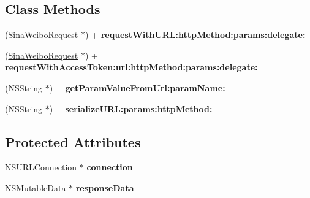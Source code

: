 \subsection*{Class Methods}
\begin{DoxyCompactItemize}
\item 
\mbox{\label{interfaceSinaWeiboRequest_a4ea79b9488ce4e5341ebba2f65e2be1d}} 
(\hyperlink{interfaceSinaWeiboRequest}{Sina\+Weibo\+Request} $\ast$) + {\bfseries request\+With\+U\+R\+L\+:http\+Method\+:params\+:delegate\+:}
\item 
\mbox{\label{interfaceSinaWeiboRequest_a5e9c06bb465cb154c54b8b13efdc5c0e}} 
(\hyperlink{interfaceSinaWeiboRequest}{Sina\+Weibo\+Request} $\ast$) + {\bfseries request\+With\+Access\+Token\+:url\+:http\+Method\+:params\+:delegate\+:}
\item 
\mbox{\label{interfaceSinaWeiboRequest_a4c5d3d9da52ef6930f3b8d034b1e2ee2}} 
(N\+S\+String $\ast$) + {\bfseries get\+Param\+Value\+From\+Url\+:param\+Name\+:}
\item 
\mbox{\label{interfaceSinaWeiboRequest_a47bd701ce6deb9808ce9c0bd159d33e7}} 
(N\+S\+String $\ast$) + {\bfseries serialize\+U\+R\+L\+:params\+:http\+Method\+:}
\end{DoxyCompactItemize}
\subsection*{Protected Attributes}
\begin{DoxyCompactItemize}
\item 
\mbox{\label{interfaceSinaWeiboRequest_aba117f82c13cf1c30a80bec9460656d4}} 
N\+S\+U\+R\+L\+Connection $\ast$ {\bfseries connection}
\item 
\mbox{\label{interfaceSinaWeiboRequest_ac6b04632236e63d6daf22cf093a2fc2c}} 
N\+S\+Mutable\+Data $\ast$ {\bfseries response\+Data}
\end{DoxyCompactItemize}
